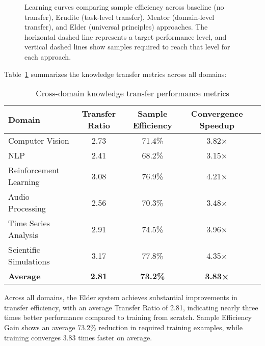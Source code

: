 \begin{figure}[h]
\caption{Learning curves comparing sample efficiency across baseline (no transfer), Erudite (task-level transfer), Mentor (domain-level transfer), and Elder (universal principles) approaches. The horizontal dashed line represents a target performance level, and vertical dashed lines show samples required to reach that level for each approach.}
\label{fig:sample_efficiency}
\end{figure}

Table~\ref{tab:transfer_performance} summarizes the knowledge transfer metrics across all domains:

\begin{table}[h]
\centering
\begin{tabular}{|l|c|c|c|c|}
\hline
\textbf{Domain} & \textbf{Transfer Ratio} & \textbf{Sample Efficiency} & \textbf{Convergence Speedup} \\
\hline
Computer Vision & 2.73 & 71.4\% & 3.82× \\
\hline
NLP & 2.41 & 68.2\% & 3.15× \\
\hline
Reinforcement Learning & 3.08 & 76.9\% & 4.21× \\
\hline
Audio Processing & 2.56 & 70.3\% & 3.48× \\
\hline
Time Series Analysis & 2.91 & 74.5\% & 3.96× \\
\hline
Scientific Simulations & 3.17 & 77.8\% & 4.35× \\
\hline
\textbf{Average} & \textbf{2.81} & \textbf{73.2\%} & \textbf{3.83×} \\
\hline
\end{tabular}
\caption{Cross-domain knowledge transfer performance metrics}
\label{tab:transfer_performance}
\end{table}

Across all domains, the Elder system achieves substantial improvements in transfer efficiency, with an average Transfer Ratio of 2.81, indicating nearly three times better performance compared to training from scratch. Sample Efficiency Gain shows an average 73.2\% reduction in required training examples, while training converges 3.83 times faster on average.


